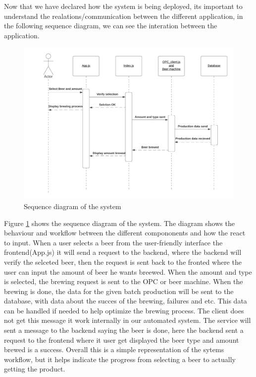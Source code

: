 
Now that we have declared how the system is being deployed, its important to understand the realations/communication between the different application, in the following sequence diagram, we can see the interation between the application.

\begin{center}
    \centering
    \begin{figure}[H]
        \includegraphics[width=1\textwidth]{img/SQdiagram_implementation.png}
        \caption{Sequence diagram of the system}
        \label{fig:SQdiagram_implementation}
    \end{figure}
\end{center}

Figure \ref{fig:SQdiagram_implementation} shows the sequence diagram of the system. The diagram shows the behaviour and workflow between the different compononents and how the react to input. When a user selects a beer from the user-friendly interface the frontend(App.js) it will send a request to the backend, where the backend will verify the selceted beer, then the request is sent back to the fronted where the user can input the amount of beer he wants breewed. When the amount and type is selected, the brewing request is sent to the OPC or beer machine. 
When the brewing is done, the data for the given batch production will be sent to the database, with data about the succes of the brewing, failures and etc. This data can be handled if needed to help optimize the brewing process. The client does not get this message it work internally in our automated system. The service will sent a message to the backend saying the beer is done, here the backend sent a request to the frontend where it user get displayed the beer type and amount brewed is a success.
Overall this is a simple representation of the sytems workflow, but it helps indicate the progress from selecting a beer to actually getting the product.